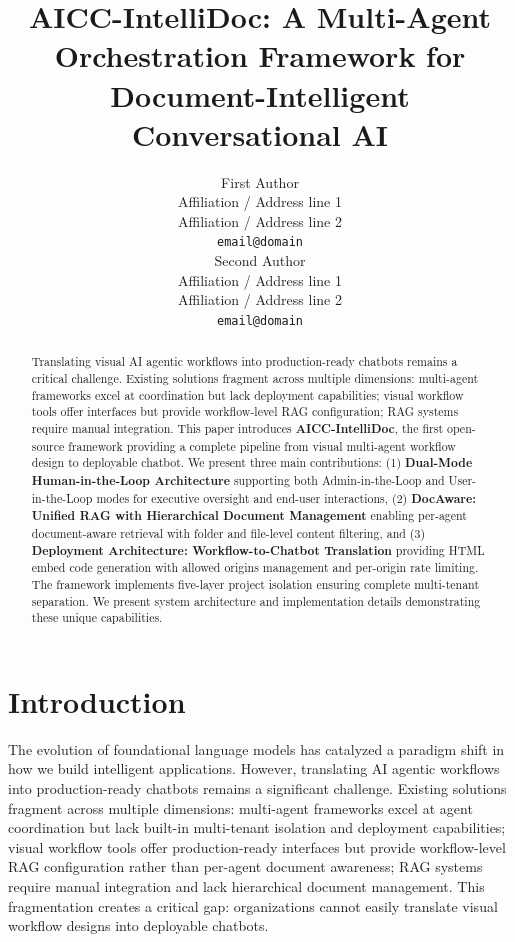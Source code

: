 \documentclass[11pt]{article}
\title{AICC-IntelliDoc: A Multi-Agent Orchestration Framework for Document-Intelligent Conversational AI}
\author{First Author \\
  Affiliation / Address line 1 \\
  Affiliation / Address line 2 \\
  \texttt{email@domain} \\\And
  Second Author \\
  Affiliation / Address line 1 \\
  Affiliation / Address line 2 \\
  \texttt{email@domain} \\}
\begin{document}
\maketitle

\begin{abstract}
Translating visual AI agentic workflows into production-ready chatbots remains a critical challenge. Existing solutions fragment across multiple dimensions: multi-agent frameworks excel at coordination but lack deployment capabilities; visual workflow tools offer interfaces but provide workflow-level RAG configuration; RAG systems require manual integration. This paper introduces \textbf{AICC-IntelliDoc}, the first open-source framework providing a complete pipeline from visual multi-agent workflow design to deployable chatbot. We present three main contributions: (1) \textbf{Dual-Mode Human-in-the-Loop Architecture} supporting both Admin-in-the-Loop and User-in-the-Loop modes for executive oversight and end-user interactions, (2) \textbf{DocAware: Unified RAG with Hierarchical Document Management} enabling per-agent document-aware retrieval with folder and file-level content filtering, and (3) \textbf{Deployment Architecture: Workflow-to-Chatbot Translation} providing HTML embed code generation with allowed origins management and per-origin rate limiting. The framework implements five-layer project isolation ensuring complete multi-tenant separation. We present system architecture and implementation details demonstrating these unique capabilities.
\end{abstract}

\section{Introduction}

The evolution of foundational language models has catalyzed a paradigm shift in how we build intelligent applications. However, translating AI agentic workflows into production-ready chatbots remains a significant challenge. Existing solutions fragment across multiple dimensions: multi-agent frameworks excel at agent coordination but lack built-in multi-tenant isolation and deployment capabilities; visual workflow tools offer production-ready interfaces but provide workflow-level RAG configuration rather than per-agent document awareness; RAG systems require manual integration and lack hierarchical document management. This fragmentation creates a critical gap: organizations cannot easily translate visual workflow designs into deployable chatbots.
\end{document}

